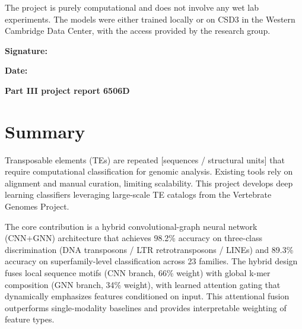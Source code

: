\documentclass[12pt]{article}
\begin{document}
\vspace{1.5cm}

\noindent The project is purely computational and does not involve any wet lab experiments. The models were either trained locally or on CSD3 in the Western Cambridge Data Center, with the access provided by the research group. 

\vspace{2cm}

\noindent\textbf{Signature:} \hrulefill

\vspace{1cm}

\noindent\textbf{Date:} \hrulefill

\newpage
\thispagestyle{empty}

\vspace*{\fill}
\begin{center}
    {\fontsize{24.88}{34}\selectfont\bfseries Part III project report 6506D\par}
\end{center}
\vspace*{\fill}

\newpage
\section*{Summary}

Transposable elements (TEs) are repeated [sequences / structural units] that require computational classification for genomic analysis. Existing tools rely on alignment and manual curation, limiting scalability. This project develops deep learning classifiers leveraging large-scale TE catalogs from the Vertebrate Genomes Project.

The core contribution is a hybrid convolutional-graph neural network (CNN+GNN) architecture that achieves 98.2\% accuracy on three-class discrimination (DNA transposons / LTR retrotransposons / LINEs) and 89.3\% accuracy on superfamily-level classification across 23 families. The hybrid design fuses local sequence motifs (CNN branch, 66\% weight) with global k-mer composition (GNN branch, 34\% weight), with learned attention gating that dynamically emphasizes features conditioned on input. This attentional fusion outperforms single-modality baselines and provides interpretable weighting of feature types.
\end{document}

